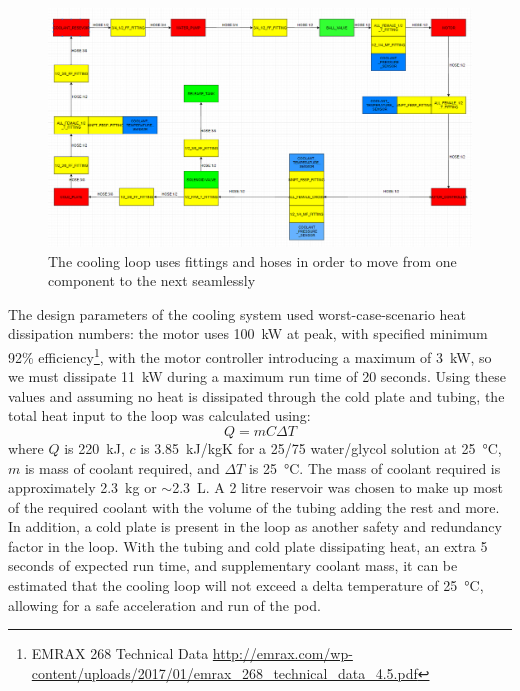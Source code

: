 \documentclass[main.tex]{subfiles}
\begin{document}
    \begin{figure}
        \centering
        \includegraphics[width=\linewidth]{images/fig18}
        \caption{The cooling loop uses fittings and hoses in order to move from one component to the next seamlessly}
        \label{fig:cooling-loop}
    \end{figure}
    The design parameters of the cooling system used worst-case-scenario heat dissipation numbers: the motor uses \SI{100}{kW} at peak, with specified minimum 92\% efficiency\footnote{EMRAX 268 Technical Data \url{http://emrax.com/wp-content/uploads/2017/01/emrax_268_technical_data_4.5.pdf}}, with the motor controller introducing a maximum of \SI{3}{kW}, so we must dissipate \SI{11}{kW} during a maximum run time of 20 seconds. Using these values and assuming no heat is dissipated through the cold plate and tubing, the total heat input to the loop was calculated using:
\begin{equation}
Q = mC\Delta T
\end{equation}
where $Q$ is \SI{220}{kJ}, $c$ is \SI{3.85}{kJ/kgK} for a 25/75 water/glycol solution at \SI{25}{\celsius}, $m$ is mass of coolant required, and $\Delta T$ is \SI{25}{\celsius}. The mass of coolant required is approximately \SI{2.3}{kg} or $\sim$\SI{2.3}{L}. A 2 litre reservoir was chosen to make up most of the required coolant with the volume of the tubing adding the rest and more. In addition, a cold plate is present in the loop as another safety and redundancy factor in the loop. With the tubing and cold plate dissipating heat, an extra 5 seconds of expected run time, and supplementary coolant mass, it can be estimated that the cooling loop will not exceed a delta temperature of \SI{25}{\celsius}, allowing for a safe acceleration and run of the pod.\\
\end{document}
